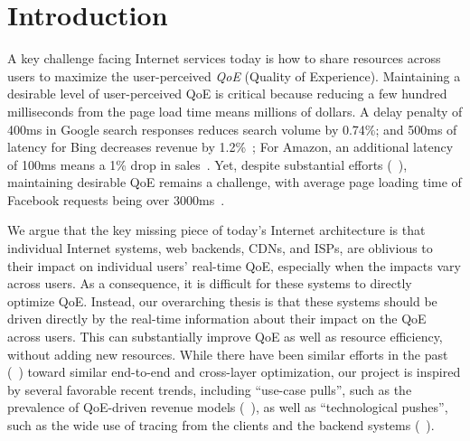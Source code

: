 
\section{Introduction}

\noindent A key challenge facing Internet services today is how to share resources across users to maximize the user-perceived {\em QoE} (Quality of Experience). %
Maintaining a desirable level of user-perceived QoE is critical because reducing a few hundred milliseconds from the page load time means millions of dollars.
A delay penalty of 400ms in Google search responses reduces search volume by 0.74\%; and 500ms of latency for Bing decreases revenue by 1.2\%~\cite{google-revenue,bing-revenue}; For Amazon, an additional latency of 100ms means a 1\% drop in sales~\cite{amazon-revenue}.
Yet, despite substantial efforts (\eg~\cite{shandian,gaze,rosen2017push,jalaparti2013speeding}), maintaining desirable QoE remains a challenge, with average page loading time of Facebook requests being over 3000ms~\cite{mystery}.

We argue that the key missing piece of today's Internet architecture is that individual Internet systems, \eg web backends, CDNs, and ISPs, are oblivious to their impact on individual users' real-time QoE, especially when the impacts vary across users.
As a consequence, it is difficult for these systems to directly optimize QoE. 
Instead, our overarching thesis is that these systems should be driven directly by the real-time information about their impact on the QoE across users. This can substantially improve QoE as well as resource efficiency, without adding new resources.
While there have been similar efforts in the past (\eg~\cite{alto,frank2013pushing,xie2008p4p,jiang2009cooperative}) toward similar end-to-end and cross-layer optimization, our project is inspired by several favorable recent trends, including ``use-case pulls'', such as the prevalence of QoE-driven revenue models (\eg~\cite{akamai-report,dobrian2011understanding}), as well as ``technological pushes'', such as the wide use of tracing from the clients and the backend systems (\eg~\cite{mystery,zhao2014lprof,odin}). 

